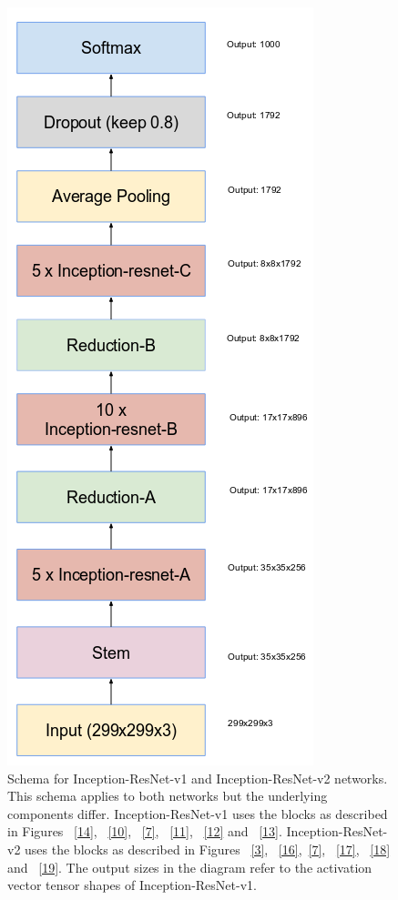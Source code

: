 \documentclass[a4paper,12pt, twoside]{NITKReport}
\begin{document}
\begin{figure}
\begin{minipage}[b]{0.4\textwidth}
    \includegraphics[width=\textwidth]{figure15.png}
    \caption{Schema   for   Inception-ResNet-v1   and   Inception-ResNet-v2 networks.  This schema applies to both networks but the underlying components differ.  Inception-ResNet-v1 uses the blocks as described in Figures ~\ref{14}, ~\ref{10}, ~\ref{7}, ~\ref{11}, ~\ref{12} and ~\ref{13}. Inception-ResNet-v2 uses the blocks as described in Figures ~\ref{3}, ~\ref{16},~\ref{7}, ~\ref{17}, ~\ref{18} and  ~\ref{19}. The output sizes in the diagram refer to the  activation vector tensor shapes of Inception-ResNet-v1.~\cite{szegedy2017inception}}
    \label{15}
  \end{minipage}
\end{figure}
\end{document}
